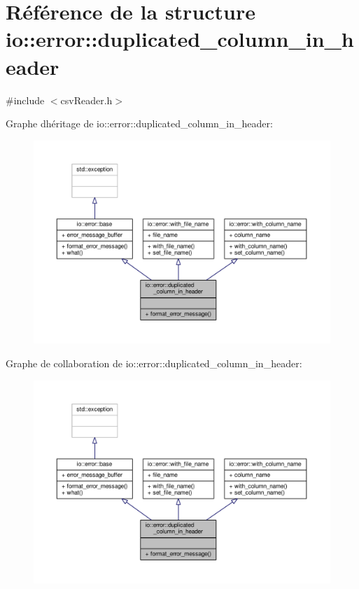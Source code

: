 \hypertarget{structio_1_1error_1_1duplicated__column__in__header}{}\section{Référence de la structure io\+:\+:error\+:\+:duplicated\+\_\+column\+\_\+in\+\_\+header}
\label{structio_1_1error_1_1duplicated__column__in__header}


{\ttfamily \#include $<$csv\+Reader.\+h$>$}



Graphe d\textquotesingle{}héritage de io\+:\+:error\+:\+:duplicated\+\_\+column\+\_\+in\+\_\+header\+:
\nopagebreak
\begin{figure}[H]
\begin{center}
\leavevmode
\includegraphics[width=350pt]{structio_1_1error_1_1duplicated__column__in__header__inherit__graph}
\end{center}
\end{figure}


Graphe de collaboration de io\+:\+:error\+:\+:duplicated\+\_\+column\+\_\+in\+\_\+header\+:
\nopagebreak
\begin{figure}[H]
\begin{center}
\leavevmode
\includegraphics[width=350pt]{structio_1_1error_1_1duplicated__column__in__header__coll__graph}
\end{center}
\end{figure}
